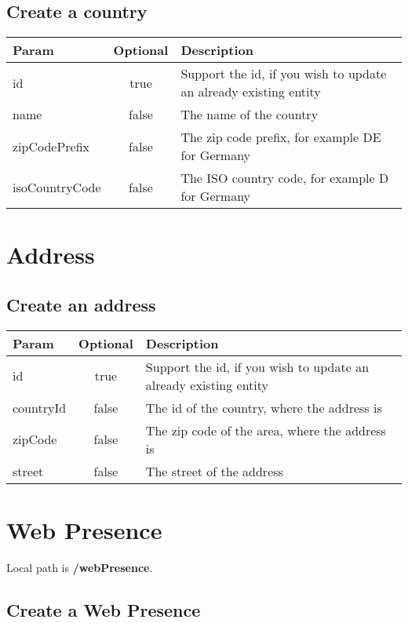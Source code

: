 \documentclass[a4paper,10pt]{report}
\newcommand{\thead}[1]{\textbf{\large{#1}}}
\begin{document}
\subsection{Create a country}
\label{s:ccountry}

\begin{tabular}{l | c | l}
\thead{Param} & \thead{Optional} & \thead{Description}\\
\hline
id & true & Support the id, if you wish to update an already existing entity\\
name & false & The name of the country \\
zipCodePrefix & false & The zip code prefix, for example DE for Germany \\
isoCountryCode & false & The ISO country code, for example D for Germany
 
\end{tabular} 

\section{Address}
\label{sec:address}

\subsection{Create an address}
\label{s:caddress}

\begin{tabular}{l | c | l}
\thead{Param} & \thead{Optional} & \thead{Description}\\
\hline
id & true & Support the id, if you wish to update an already existing entity\\
countryId & false & The id of the country, where the address is\\
zipCode & false & The zip code of the area, where the address is \\
street & false & The street of the address \\
 
\end{tabular} 


\section{Web Presence}
\label{sec:WebPresence}

Local path is \textbf{/webPresence}.

\subsection{Create a Web Presence}
\label{s:cWebPresence}
\end{document}
